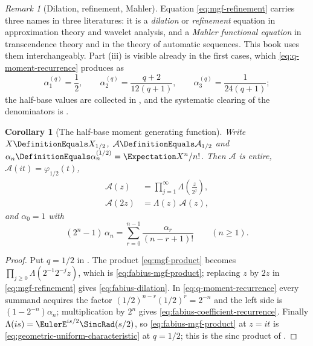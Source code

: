 \documentclass[11pt,a4paper,oneside,openany]{book}
\newtheorem{corollary}[corollary]{Corollary}
\theoremstyle{definition}
\theoremstyle{remark}
\newtheorem{remark}[remark]{Remark}
\begin{document}
\begin{remark}[Dilation, refinement, Mahler]\label{rem:mgf-names}
Equation \eqref{eq:mgf-refinement} carries three names in three literatures: it is a
\emph{dilation} or \emph{refinement} equation in approximation theory and wavelet analysis,
and a \emph{Mahler functional equation} in transcendence theory and in the theory of automatic
sequences.  This book uses them interchangeably.  Part (iii) is visible already in the first
cases, which \eqref{eq:q-moment-recurrence} produces as
\[
 \alpha^{(q)}_1=\frac12,
 \qquad
 \alpha^{(q)}_2=\frac{q+2}{12(q+1)},
 \qquad
 \alpha^{(q)}_3=\frac1{24(q+1)};
\]
the half-base values are collected in , and the systematic
clearing of the denominators is .
\end{remark}

\begin{corollary}[The half-base moment generating function]\label{lem:fabius-moment-dilation}
Write $X\DefinitionEquals X_{1/2}$, $\mathcal A\DefinitionEquals\mathcal A_{1/2}$ and
$\alpha_n\DefinitionEquals\alpha^{(1/2)}_n=\Expectation X^n/n!$.  Then $\mathcal A$ is entire,
$\mathcal A(it)=\varphi_{1/2}(t)$,
\begin{align}
 \mathcal A(z)&=\prod_{j=1}^{\infty}\Lambda\!\left(\frac z{2^j}\right),
 \label{eq:fabius-mgf-product}\\
 \mathcal A(2z)&=\Lambda(z)\,\mathcal A(z),
 \label{eq:fabius-dilation}
\end{align}
and $\alpha_0=1$ with
\begin{equation}\label{eq:fabius-coefficient-recurrence}
 (2^n-1)\,\alpha_n=\sum_{r=0}^{n-1}\frac{\alpha_r}{(n-r+1)!}
 \qquad(n\ge1).
\end{equation}
\end{corollary}

\begin{proof}
Put $q=1/2$ in .  The product
\eqref{eq:mgf-product} becomes $\prod_{j\ge0}\Lambda(2^{-1}2^{-j}z)$, which is
\eqref{eq:fabius-mgf-product}; replacing $z$ by $2z$ in \eqref{eq:mgf-refinement} gives
\eqref{eq:fabius-dilation}.  In \eqref{eq:q-moment-recurrence} every summand acquires the
factor $(1/2)^{n-r}(1/2)^r=2^{-n}$ and the left side is $(1-2^{-n})\alpha_n$;
multiplication by $2^n$ gives \eqref{eq:fabius-coefficient-recurrence}.  Finally
$\Lambda(is)=\EulerE^{is/2}\SincRad(s/2)$, so \eqref{eq:fabius-mgf-product} at
$z=it$ is \eqref{eq:geometric-uniform-characteristic} at $q=1/2$; this is the sinc product
of .
\end{proof}
\end{document}
